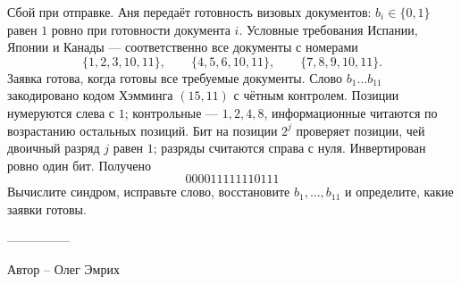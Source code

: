 \question
Сбой при отправке. Аня передаёт готовность визовых документов: $b_i\in\{0,1\}$ равен $1$ ровно при готовности документа $i$. Условные требования Испании, Японии и Канады --- соответственно все документы с номерами
\[
\{1,2,3,10,11\},\qquad \{4,5,6,10,11\},\qquad \{7,8,9,10,11\}.
\]
Заявка готова, когда готовы все требуемые документы. Слово $b_1\ldots b_{11}$ закодировано кодом Хэмминга $(15,11)$ с чётным контролем. Позиции нумеруются слева с $1$; контрольные --- $1,2,4,8$, информационные читаются по возрастанию остальных позиций. Бит на позиции $2^j$ проверяет позиции, чей двоичный разряд $j$ равен $1$; разряды считаются справа с нуля. Инвертирован ровно один бит. Получено
\[
000011111110111
\]
Вычислите синдром, исправьте слово, восстановите $b_1,\ldots,b_{11}$ и определите, какие заявки готовы.

---------------

Автор -- Олег Эмрих
